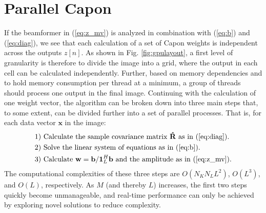 \documentclass[journal]{IEEEtran}
\newcommand{\mat}[1]{\mathbf{#1}}
\renewcommand{\vec}[1]{\mathbf{#1}}
\begin{document}
\section{Parallel Capon}\label{sec:meth}
If the beamformer in (\ref{eq:z_mv}) is analyzed in combination with (\ref{eq:b}) and (\ref{eq:diag}), we see that each calculation of a set of Capon weights is independent across the outputs $z[n]$. As shown in Fig. \ref{fig:gpulayout}, a first level of granularity is therefore to divide the image into a grid, where the output in each cell can be calculated independently. Further, based on memory dependencies and to hold memory consumption per thread at a minimum, a group of threads should process one output in the final image. Continuing with the calculation of one weight vector, the algorithm can be broken down into three main steps that, to some extent, can be divided further into a set of parallel processes. That is, for each data vector $\vec{x}$ in the image:
\begin{align*}
\text{1) } &\text{Calculate the sample covariance matrix } \mat{\hat{R}} \text{ as in } \text{(\ref{eq:diag})}.\\
\text{2) } &\text{Solve the linear system of equations as in (\ref{eq:b}}).\\ %
\text{3) } &\text{Calculate } \vec{w} = \vec{b}/\vec{1}_{L}^H\vec{b} \text{ and the amplitude as in (\ref{eq:z_mv})}.
\end{align*}
The computational complexities of these three steps are $O(N_KN_LL^2)$, $O(L^3)$, and $O(L)$, respectively. As $M$ (and thereby $L$) increases, the first two steps quickly become unmanageable, and real-time performance can only be achieved by exploring novel solutions to reduce complexity.
\end{document}
